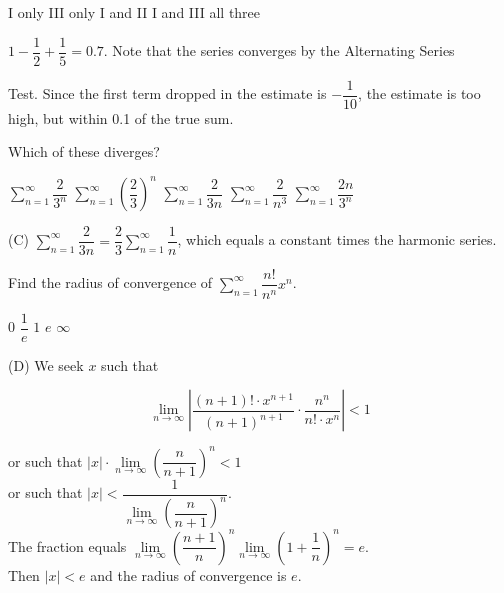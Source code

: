 \begin{choices}
  \choice I only
  \choice III only
  \choice I and II
  \choice I and III
  \choice all three
\end{choices}
\begin{solution}
$1-\dfrac{1}{2}+\dfrac{1}{5}=0.7$. Note that the series converges by the Alternating Series


Test. Since the first term dropped in the estimate is $-\dfrac{1}{10}$, the estimate is too high, but within 0.1 of the true sum.
\end{solution}

\question
Which of these diverges?
\begin{choices}
  \choice $\sum\limits_{n=1}^{\infty} \dfrac{2}{3^{n}}$
  \choice $\sum\limits_{n=1}^{\infty}\left(\dfrac{2}{3}\right)^{n}$
  \choice $\sum\limits_{n=1}^{\infty} \dfrac{2}{3 n}$
  \choice $\sum\limits_{n=1}^{\infty} \dfrac{2}{n^{3}}$
  \choice $\sum\limits_{n=1}^{\infty} \dfrac{2 n}{3^{n}}$
\end{choices}
\begin{solution}
(C) $\sum\limits_{n=1}^{\infty} \dfrac{2}{3 n}=\dfrac{2}{3} \sum\limits_{n=1}^{\infty} \dfrac{1}{n}$, which equals a constant times the harmonic series.
\end{solution}





\newpage





\question
Find the radius of convergence of $\sum\limits_{n=1}^{\infty} \dfrac{n!}{n^{n}} x^{n}$.
\begin{choices}
  \choice $0$
  \choice $\dfrac{1}{e}$
  \choice $1$
  \choice $e$
  \choice $\infty$
\end{choices}
\begin{solution}
(D) We seek $x$ such that

\[
\lim\limits_{n \to \infty}\left|\dfrac{(n+1)!\cdot x^{n+1}}{(n+1)^{n+1}} \cdot \dfrac{n^{n}}{n!\cdot x^{n}}\right|<1
\]

or such that $|x| \cdot \lim\limits_{n \to \infty}\left(\dfrac{n}{n+1}\right)^{n}<1$\\
or such that $|x|<\dfrac{1}{\lim\limits_{n \to \infty}\left(\dfrac{n}{n+1}\right)^{n}}$.\\
The fraction equals $\lim\limits_{n \to \infty}\left(\dfrac{n+1}{n}\right)^{n} \lim\limits_{n \to \infty}\left(1+\dfrac{1}{n}\right)^{n}=e$.\\
Then $|x|<e$ and the radius of convergence is $e$.
\end{solution}

